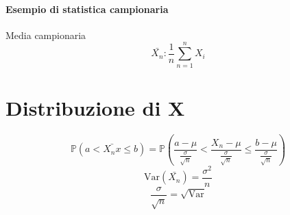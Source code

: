 \documentclass[12pt, a4paper, openany]{book}
\begin{document}
\paragraph*{Esempio di statistica campionaria} Media campionaria
\begin{equation*}
    \bar{X_n}:\frac{1}{n}\sum_{n=1}^n X_i
\end{equation*}
\section{Distribuzione di X}
\begin{equation*}
    \mathbb{P} (a  < \bar{X_nx} \leq b) = \mathbb{P} (\frac{a - \mu}{\frac{\sigma}{\sqrt{n}}} 
    < \frac{X_n - \mu}{\frac{\sigma}{\sqrt{n}}} \leq \frac{b - \mu}{\frac{\sigma}{\sqrt{n}}})   
\end{equation*}
\begin{equation*}
    \text{Var}(\bar{X_n}) = \frac{\sigma ^ 2}{n} 
\end{equation*}
\begin{equation*}
    \frac{\sigma}{\sqrt{n}} = \sqrt{\text{Var}}
\end{equation*}

\end{document}
